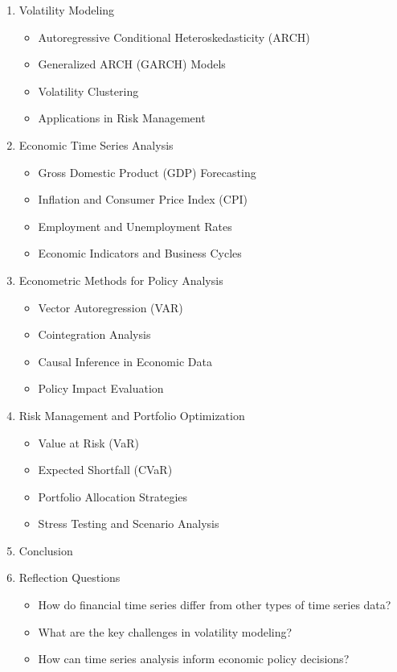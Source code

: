 \begin{enumerate}
\item Volatility Modeling
\begin{itemize}
\item Autoregressive Conditional Heteroskedasticity (ARCH)
\item Generalized ARCH (GARCH) Models
\item Volatility Clustering
\item Applications in Risk Management
\end{itemize}

\item Economic Time Series Analysis
\begin{itemize}
\item Gross Domestic Product (GDP) Forecasting
\item Inflation and Consumer Price Index (CPI)
\item Employment and Unemployment Rates
\item Economic Indicators and Business Cycles
\end{itemize}

\item Econometric Methods for Policy Analysis
\begin{itemize}
\item Vector Autoregression (VAR)
\item Cointegration Analysis
\item Causal Inference in Economic Data
\item Policy Impact Evaluation
\end{itemize}

\item Risk Management and Portfolio Optimization
\begin{itemize}
\item Value at Risk (VaR)
\item Expected Shortfall (CVaR)
\item Portfolio Allocation Strategies
\item Stress Testing and Scenario Analysis
\end{itemize}

\item Conclusion

\item Reflection Questions
\begin{itemize}
\item How do financial time series differ from other types of time series data?
\item What are the key challenges in volatility modeling?
\item How can time series analysis inform economic policy decisions?
\end{itemize}
\end{enumerate}

